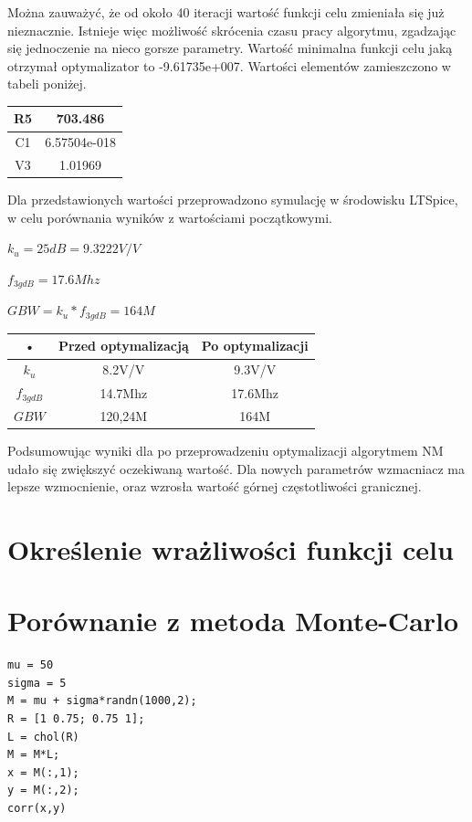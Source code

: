 \documentclass[10pt,a4paper]{article}
\begin{document}
Można zauważyć, że od około 40 iteracji wartość funkcji celu zmieniała się już nieznacznie.
Istnieje więc możliwość skrócenia czasu pracy algorytmu, zgadzając się jednoczenie na nieco gorsze parametry.
Wartość minimalna funkcji celu jaką otrzymał optymalizator to -9.61735e+007.
Wartości elementów zamieszczono w tabeli poniżej.

\begin{tabular}{|c|c|}
\hline 
R5 & 703.486 \\ 
\hline 
C1 & 6.57504e-018 \\ 
\hline 
V3 & 1.01969 \\ 
\hline 
\end{tabular} 

Dla przedstawionych wartości przeprowadzono symulację w środowisku LTSpice, w celu porównania wyników z wartościami początkowymi.

$ k_u = 25dB = 9.3222 V/V  $

$ f_{3gdB} = 17.6Mhz  $

$ GBW = k_u * f_{3gdB} = 164M  $


\begin{tabular}{|c|c|c|}
\hline 
• & Przed optymalizacją & Po optymalizacji \\ 
\hline 
$ k_u $ & 8.2V/V & 9.3V/V \\ 
\hline 
$ f_{3gdB} $ & 14.7Mhz & 17.6Mhz \\ 
\hline 
$ GBW $ & 120,24M & 164M \\ 
\hline 
\end{tabular} 


Podsumowując wyniki dla po przeprowadzeniu optymalizacji algorytmem NM udało się zwiększyć oczekiwaną wartość.
Dla nowych parametrów wzmacniacz ma lepsze wzmocnienie, oraz wzrosła wartość górnej częstotliwości granicznej.


\section{Określenie wrażliwości funkcji celu}

\section{Porównanie z metoda Monte-Carlo}

\begin{verbatim}
mu = 50
sigma = 5
M = mu + sigma*randn(1000,2);
R = [1 0.75; 0.75 1];
L = chol(R)
M = M*L;
x = M(:,1);
y = M(:,2);
corr(x,y)
\end{verbatim}
\end{document}
